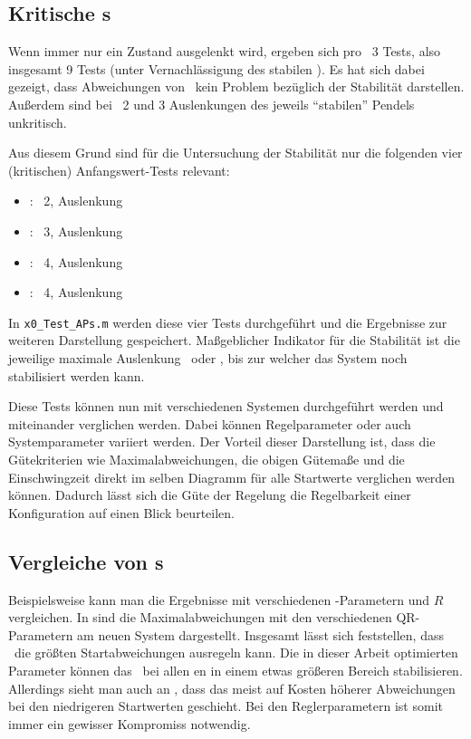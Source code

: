 \subsection{Kritische \xots s}\label{subsec:xotskrit}

Wenn immer nur ein Zustand ausgelenkt wird, ergeben sich pro \ap\ 3 Tests, also insgesamt 9 Tests (unter Vernachlässigung des stabilen \ape).
Es hat sich dabei gezeigt, dass Abweichungen von \xo\ kein Problem bezüglich der Stabilität darstellen.
Außerdem sind bei \ap\ 2 und 3 Auslenkungen des jeweils "`stabilen"' Pendels unkritisch.

Aus diesem Grund sind für die Untersuchung der Stabilität nur die folgenden vier (kritischen) Anfangswert-Tests relevant:
\begin{itemize}
	\item \texttt{\apz}: \ap\ 2, Auslenkung \phz
	\item \texttt{\apd}: \ap\ 3, Auslenkung \phe
	\item \texttt{}: \ap\ 4, Auslenkung \phe
	\item \texttt{}: \ap\ 4, Auslenkung \phz
\end{itemize}
In \texttt{x0\_Test\_APs.m} werden diese vier Tests durchgeführt und die Ergebnisse zur weiteren Darstellung gespeichert.
Maßgeblicher Indikator für die Stabilität ist die jeweilige maximale Auslenkung \phe\ oder \phz, bis zur welcher das System noch stabilisiert werden kann.

Diese Tests können nun mit verschiedenen Systemen durchgeführt werden und miteinander verglichen werden.
Dabei können Regelparameter oder auch Systemparameter variiert werden.
Der Vorteil dieser Darstellung ist, dass die Gütekriterien wie Maximalabweichungen, die obigen Gütemaße und die Einschwingzeit direkt im selben Diagramm für alle Startwerte verglichen werden können.
Dadurch lässt sich die Güte der Regelung \bzw die Regelbarkeit einer Konfiguration auf einen Blick beurteilen.


\subsection{Vergleiche von \xots s}\label{subsec:xotsvgl}

Beispielsweise kann man die Ergebnisse mit verschiedenen \ricc-Parametern  und $R$ vergleichen.
In  sind die Maximalabweichungen mit den verschiedenen QR-Parametern  am neuen System dargestellt.
Insgesamt lässt sich feststellen, dass \apd\ die größten Startabweichungen ausregeln kann.
Die in dieser Arbeit optimierten Parameter können das \dpd\ bei allen \ap en in einem etwas größeren Bereich stabilisieren.
Allerdings sieht man auch \zB an \apve, dass das meist auf Kosten höherer Abweichungen bei den niedrigeren Startwerten geschieht.
Bei den Reglerparametern ist somit immer ein gewisser Kompromiss notwendig.

